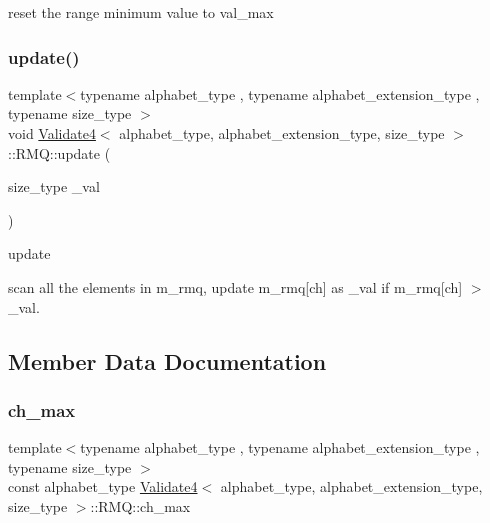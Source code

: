 reset the range minimum value to val\+\_\+max 

\mbox{\label{struct_validate4_1_1_r_m_q_a51f01cfbe100d40fc976fd2e1e8b6d16}} 
\subsubsection{\texorpdfstring{update()}{update()}}
{\footnotesize\ttfamily template$<$typename alphabet\+\_\+type , typename alphabet\+\_\+extension\+\_\+type , typename size\+\_\+type $>$ \\
void \hyperlink{class_validate4}{Validate4}$<$ alphabet\+\_\+type, alphabet\+\_\+extension\+\_\+type, size\+\_\+type $>$\+::R\+M\+Q\+::update (\begin{DoxyParamCaption}\item[{size\+\_\+type}]{\+\_\+val }\end{DoxyParamCaption})\hspace{0.3cm}{\ttfamily [inline]}}



update 

scan all the elements in m\+\_\+rmq, update m\+\_\+rmq\mbox{[}ch\mbox{]} as \+\_\+val if m\+\_\+rmq\mbox{[}ch\mbox{]} $>$ \+\_\+val. 

\subsection{Member Data Documentation}
\mbox{\label{struct_validate4_1_1_r_m_q_a0addfc5d1067fca9a97939554cb0cd70}} 
\subsubsection{\texorpdfstring{ch\+\_\+max}{ch\_max}}
{\footnotesize\ttfamily template$<$typename alphabet\+\_\+type , typename alphabet\+\_\+extension\+\_\+type , typename size\+\_\+type $>$ \\
const alphabet\+\_\+type \hyperlink{class_validate4}{Validate4}$<$ alphabet\+\_\+type, alphabet\+\_\+extension\+\_\+type, size\+\_\+type $>$\+::R\+M\+Q\+::ch\+\_\+max\hspace{0.3cm}{\ttfamily [private]}}


